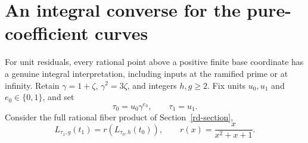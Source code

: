 \section{An integral converse for the pure-coefficient curves}
\label{ci-section}

For unit residuals, every rational point above a positive finite base
coordinate has a genuine integral interpretation, including inputs
at the ramified prime or at infinity. Retain $\gamma=1+\zeta$,
$\gamma^2=3\zeta$, and integers $h,g\ge2$. Fix units $u_0,u_1$
and $e_0\in\{0,1\}$, and set
\[
 \tau_0=u_0\gamma^{e_0},\qquad\tau_1=u_1.
\]
Consider the full rational fiber product of Section~\ref{rd-section},
\begin{equation}\label{ci-fiber-product}
 L_{\tau_1,g}(t_1)=r(L_{\tau_0,h}(t_0)),\qquad
 r(x)=\frac{x}{x^2+x+1}.
\end{equation}

